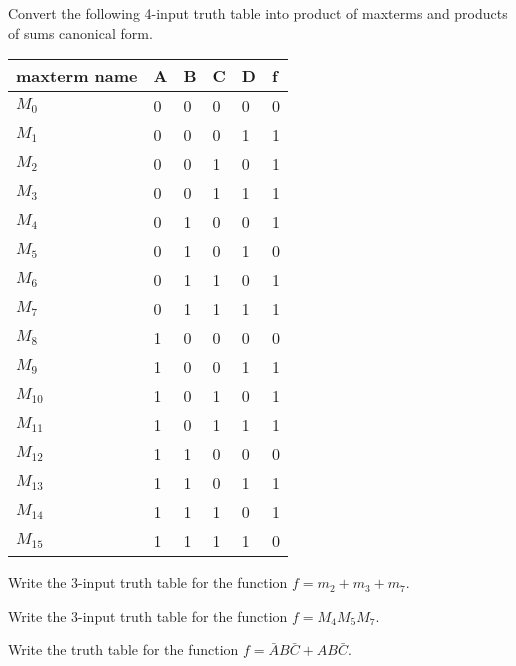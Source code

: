 \begin{prob}[10 marks]
  Convert the following 4-input truth table into product of maxterms and products of sums canonical form.

  \noindent
  \begin{tabular}{p{20mm}llll|l}
    \toprule
    maxterm name & A & B & C & D & f \\
    \midrule
    $M_0$ & 0 & 0 & 0 & 0 & 0 \\ 
    $M_1$ & 0 & 0 & 0 & 1 & 1 \\ 
    $M_2$ & 0 & 0 & 1 & 0 & 1 \\ 
    $M_3$ & 0 & 0 & 1 & 1 & 1 \\ 
    $M_4$ & 0 & 1 & 0 & 0 & 1 \\ 
    $M_5$ & 0 & 1 & 0 & 1 & 0 \\ 
    $M_6$ & 0 & 1 & 1 & 0 & 1 \\ 
    $M_7$ & 0 & 1 & 1 & 1 & 1 \\ 
    $M_8$ & 1 & 0 & 0 & 0 & 0 \\ 
    $M_9$ & 1 & 0 & 0 & 1 & 1 \\ 
    $M_{10}$ & 1 & 0 & 1 & 0 & 1 \\
    $M_{11}$ & 1 & 0 & 1 & 1 & 1 \\
    $M_{12}$ & 1 & 1 & 0 & 0 & 0 \\
    $M_{13}$ & 1 & 1 & 0 & 1 & 1 \\
    $M_{14}$ & 1 & 1 & 1 & 0 & 1 \\
    $M_{15}$ & 1 & 1 & 1 & 1 & 0 \\
    \bottomrule
  \end{tabular}
\end{prob}

\begin{example}
  Write the 3-input truth table for the function $f = m_2 + m_3 + m_7$.
\end{example}
\vspace{10em}

\begin{prob}[10 marks]
  Write the 3-input truth table for the function $f = M_4M_5M_7$. 
\end{prob}
\vspace{10em}

\begin{prob}[10 marks]
  Write the truth table for the function $f = \bar{A}B\bar{C} + AB\bar{C}$. 
\end{prob}
\vspace{10em}
